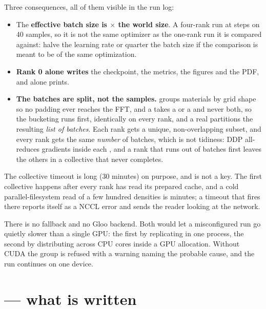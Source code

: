 Three consequences, all of them visible in the run log:

\begin{itemize}
  \item The \textbf{effective batch size is  $\times$ the world size}. A four-rank run at  steps on 40 samples, so it is not the same optimizer as the one-rank run it is compared against: halve the learning rate or quarter the batch size if the comparison is meant to be of the same optimization.
  \item \textbf{Rank 0 alone writes} the checkpoint, the metrics, the figures and the PDF, and alone prints.
  \item \textbf{The batches are split, not the samples.}  groups materials by grid shape so no padding ever reaches the FFT, and a  takes a  or a  and never both, so the bucketing runs first, identically on every rank, and a real  partitions the resulting \emph{list of batches}. Each rank gets a unique, non-overlapping subset, and every rank gets the same \emph{number} of batches, which is not tidiness: DDP all-reduces gradients inside each , and a rank that runs out of batches first leaves the others in a collective that never completes.
\end{itemize}

The collective timeout is long (30 minutes) on purpose, and is not a key. The first collective happens after every rank has read its prepared cache, and a cold parallel-filesystem read of a few hundred densities is minutes; a timeout that fires there reports itself as a NCCL error and sends the reader looking at the network.

\begin{pnote}
There is no  fallback and no Gloo backend. Both would let a misconfigured run go quietly slower than a single GPU: the first by replicating in one process, the second by distributing across CPU cores inside a GPU allocation. Without CUDA the group is refused with a warning naming the probable cause, and the run continues on one device.
\end{pnote}

\section{ --- what is written}

